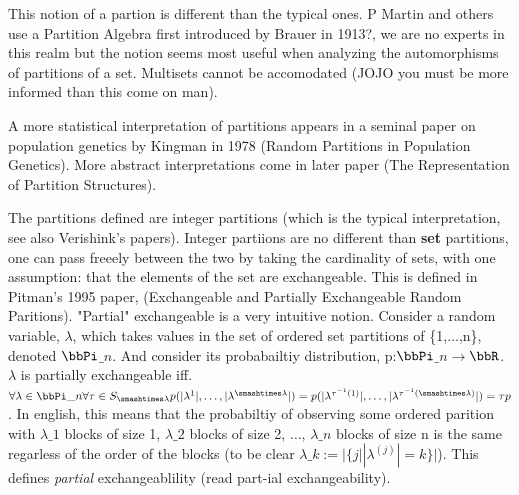 \documentclass[12pt,a4paper]{article}
\begin{document}
This notion of a partion is different than the typical ones. P Martin and others use a Partition Algebra first introduced by Brauer in 1913?, we are no experts in this realm but the notion seems most useful when analyzing the automorphisms of partitions of a set. Multisets cannot be accomodated (JOJO you must be more informed than this come on man).


A more statistical interpretation of partitions appears in a seminal paper on population genetics by Kingman in 1978 (Random Partitions in Population Genetics). More abstract interpretations come in later paper (The Representation of Partition Structures).


The partitions defined are integer partitions (which is the typical interpretation, see also Verishink's papers). Integer partiions are no different than \textbf{set} partitions, one can pass freeely between the two by taking the cardinality of sets, with one assumption: that the elements of the set are exchangeable. This is defined in Pitman's 1995 paper, (Exchangeable and Partially Exchangeable Random Paritions). "Partial" exchangeable is a very intuitive notion. Consider a random variable, \ensuremath{\lambda}, which takes values in the set of ordered set partitions of \{1,\ensuremath{\ldots},n\}, denoted \ensuremath{\bbPi}\ensuremath{\_n}. And consider its probabailtiy distribution, p:\ensuremath{\bbPi}\ensuremath{\_n}\ensuremath{\rightarrow}\ensuremath{\bbR}. \ensuremath{\lambda} is partially exchangeable iff. $\ensuremath{\forall} \ensuremath{\lambda} \ensuremath{\in} \ensuremath{\bbPi}\ensuremath{\_n} \ensuremath{\forall} \ensuremath{\tau} \ensuremath{\in} S_{\ensuremath{\smashtimes}\ensuremath{\lambda}} p(|\ensuremath{\lambda}^{1}|, \ensuremath{\ldots}, |\ensuremath{\lambda}^{\ensuremath{\smashtimes}\ensuremath{\lambda}}|) = p(|\ensuremath{\lambda}^{\ensuremath{\tau}^{-1}(1)}|, \ensuremath{\ldots}, |\ensuremath{\lambda}^{\ensuremath{\tau}^{-1}(\ensuremath{\smashtimes}\ensuremath{\lambda})}|) = \ensuremath{\tau}p$. In english, this means that the probabiltiy of observing some ordered parition with \ensuremath{\lambda}\ensuremath{\_1} blocks of size 1, \ensuremath{\lambda}\ensuremath{\_2} blocks of size 2, \ensuremath{\ldots}, \ensuremath{\lambda}\ensuremath{\_n} blocks of size n is the same regarless of the order of the blocks (to be clear $\ensuremath{\lambda}\ensuremath{\_k} := |\{j| |\ensuremath{\lambda}^{(j)}| = k \}|$). This defines \emph{partial} exchangeablility (read part-ial exchangeability).
\end{document}
